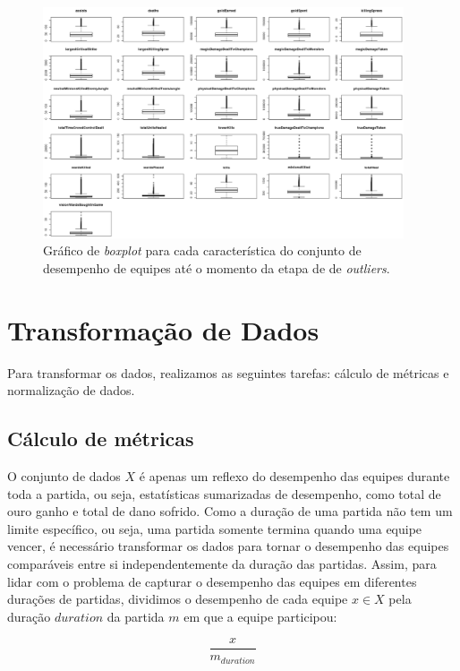 \begin{figure}
  \centering
  \includegraphics[angle=90,width=0.95\textwidth]{boxplots}%
  \caption{Gráfico de \textit{boxplot} para cada característica do conjunto de desempenho de equipes até o momento da etapa de  de \textit{outliers}.}
  \label{fig:boxplots}
\end{figure}

\section{Transformação de Dados}
Para transformar os dados, realizamos as seguintes tarefas: cálculo de métricas e normalização de dados.

\subsection{Cálculo de métricas}

O conjunto de dados $X$ é apenas um reflexo do desempenho das equipes durante toda a partida, ou seja, estatísticas sumarizadas de desempenho, como total de ouro ganho e total de dano sofrido. Como a duração de uma partida não tem um limite específico, ou seja, uma partida somente termina quando uma equipe vencer, é necessário transformar os dados para tornar o desempenho das equipes comparáveis entre si independentemente da duração das partidas. Assim, para lidar com o problema de capturar o desempenho das equipes em diferentes durações de partidas, dividimos o desempenho de cada equipe $x \in X$ pela duração $duration$ da partida $m$ em que a equipe participou:

\begin{displaymath}
  \frac{x}{m_{duration}}
\end{displaymath}

